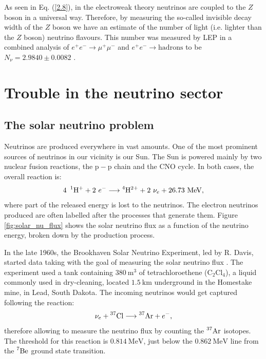 As seen in Eq. (\ref{2.8}), in the electroweak theory neutrinos are coupled to the $Z$ boson in a universal way. Therefore, by measuring the so-called invisible decay width of the $Z$ boson we have an estimate of the number of light (i.e. lighter than the $Z$ boson) neutrino flavours. This number was measured by LEP in a combined analysis of $e^{+}e^{-} \rightarrow \mu^{+}\mu^{-}$ and $e^{+}e^{-} \rightarrow \mathrm{hadrons}$ to be $N_{\nu} = 2.9840 \pm 0.0082$ \cite{ALEPH2005}.

\section{Trouble in the neutrino sector}\label{sec:nu_trouble}

\subsection{The solar neutrino problem}

Neutrinos are produced everywhere in vast amounts. One of the most prominent sources of neutrinos in our vicinity is our Sun. The Sun is powered mainly by two nuclear fusion reactions, the $\mathrm{p}-\mathrm{p}$ chain and the CNO cycle. In both cases, the overall reaction is:
\begin{equation}
	4~\prescript{1}{}{\mathrm{H}}^{+}+2~e^{-} \longrightarrow \prescript{4}{}{\mathrm{H}}^{2+} + 2~\nu_{e} + 26.73~\mathrm{MeV},
\end{equation}
where part of the released energy is lost to the neutrinos. The electron neutrinos produced are often labelled after the processes that generate them. Figure \ref{fig:solar_nu_flux} shows the solar neutrino flux as a function of the neutrino energy, broken down by the production process.

In the late 1960s, the Brookhaven Solar Neutrino Experiment, led by R. Davis, started data taking with the goal of measuring the solar neutrino flux \cite{Davis1968}. The experiment used a tank containing $380~\mathrm{m}^{3}$ of tetrachloroethene ($\mathrm{C}_{2}\mathrm{Cl}_{4}$), a liquid commonly used in dry-cleaning, located $1.5~\mathrm{km}$ underground in the Homestake mine, in Lead, South Dakota. The incoming neutrinos would get captured following the reaction:
\begin{equation}
	\nu_{e} + \prescript{37}{}{\mathrm{Cl}} \longrightarrow \prescript{37}{}{\mathrm{Ar}} + e^{-},
\end{equation}
therefore allowing to measure the neutrino flux by counting the $\prescript{37}{}{\mathrm{Ar}}$ isotopes. The threshold for this reaction is $0.814~\mathrm{MeV}$, just below the $0.862~\mathrm{MeV}$ line from the $\prescript{7}{}{\mathrm{Be}}$ ground state transition.


